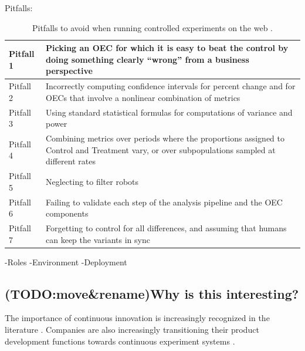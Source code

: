 \documentclass[english]{tktltiki2}
\theoremstyle{definition}
\theoremstyle{remark}
\begin{document}
Pitfalls:
\begin{center}
\begin{table}[htb]
    \begin{tabular}{ | p{2cm} | p{10cm} |}
    \hline
	Pitfall 1 & Picking an OEC for which it is easy to beat the control by doing something clearly “wrong” from a business perspective \\ \hline
	Pitfall 2 & Incorrectly computing confidence intervals for percent change and for OECs that involve a nonlinear combination of metrics \\ \hline
	Pitfall 3 & Using standard statistical formulas for computations of variance and power \\ \hline
	Pitfall 4 & Combining metrics over periods where the proportions assigned to Control and Treatment vary, or over subpopulations sampled at different rates \\ \hline
	Pitfall 5 & Neglecting to filter robots \\ \hline
	Pitfall 6 & Failing to validate each step of the analysis pipeline and the OEC components \\ \hline
	Pitfall 7 & Forgetting to control for all differences, and assuming that humans can keep the variants in sync \\ \hline
    \end{tabular}
    \caption{Pitfalls to avoid when running controlled experiments on the web \cite{crook2009seven}.}
    \end{table}
\end{center}

-Roles
-Environment
-Deployment

\subsection{(TODO:move\&rename)Why is this interesting?}

The importance of continuous innovation is increasingly recognized in the literature \cite{steiber2013corporate}. Companies are also increasingly transitioning their product development functions towards continuous experiment systems \cite{olsson2012climbing}. 

\end{document}
